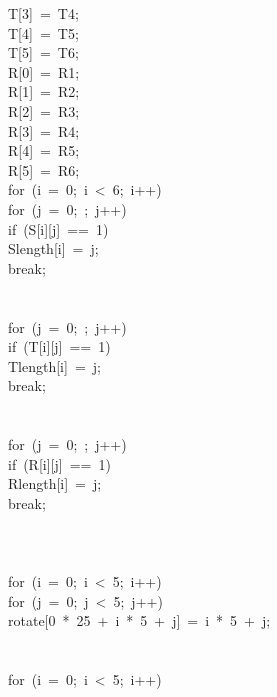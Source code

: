 \begin{tabbing}
\>T[3]\ =\ T4;\\[0pt]
\>T[4]\ =\ T5;\\[0pt]
\>T[5]\ =\ T6;\\[0pt]
\>R[0]\ =\ R1;\\[0pt]
\>R[1]\ =\ R2;\\[0pt]
\>R[2]\ =\ R3;\\[0pt]
\>R[3]\ =\ R4;\\[0pt]
\>R[4]\ =\ R5;\\[0pt]
\>R[5]\ =\ R6;\\[0pt]
\>for\ (i\ =\ 0;\ i\ <\ 6;\ i++)\ \\[0pt]
\>\>for\ (j\ =\ 0;\ ;\ j++)\ \\[0pt]
\>\>\>if\ (S[i][j]\ ==\ 1)\ \\[0pt]
\>\>\>\>Slength[i]\ =\ j;\\[0pt]
\>\>\>\>break;\\[0pt]
\>\>\>\>\\[0pt]
\>\>\>\\[0pt]
\>\>for\ (j\ =\ 0;\ ;\ j++)\ \\[0pt]
\>\>\>if\ (T[i][j]\ ==\ 1)\ \\[0pt]
\>\>\>\>Tlength[i]\ =\ j;\\[0pt]
\>\>\>\>break;\\[0pt]
\>\>\>\>\\[0pt]
\>\>\>\\[0pt]
\>\>for\ (j\ =\ 0;\ ;\ j++)\ \\[0pt]
\>\>\>if\ (R[i][j]\ ==\ 1)\ \\[0pt]
\>\>\>\>Rlength[i]\ =\ j;\\[0pt]
\>\>\>\>break;\\[0pt]
\>\>\>\>\\[0pt]
\>\>\>\\[0pt]
\>\>\\[0pt]
\>for\ (i\ =\ 0;\ i\ <\ 5;\ i++)\ \\[0pt]
\>\>for\ (j\ =\ 0;\ j\ <\ 5;\ j++)\ \\[0pt]
\>\>\>rotate[0\ *\ 25\ +\ i\ *\ 5\ +\ j]\ =\ i\ *\ 5\ +\ j;\\[0pt]
\>\>\>\\[0pt]
\>\>\\[0pt]
\>for\ (i\ =\ 0;\ i\ <\ 5;\ i++)\ \\[0pt]

\end{tabbing}
